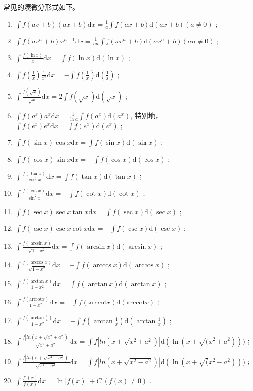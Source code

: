 常见的凑微分形式如下。

\begin{enumerate}
    \item $ \int f(ax+b)(ax+b)\mathrm{d}x = \frac{1}{a}\int f(ax+b)\mathrm{d}(ax+b) (a\neq 0) $ ;
    \item $ \int f(ax^n+b)x^{n-1}\mathrm{d}x = \frac{1}{na}\int f(ax^n+b)\mathrm{d}(ax^n + b) (an\neq0) $ ;
    \item $ \int \frac{f(\ln x)}{x}\mathrm{d}x = \int f(\ln x)\mathrm{d}(\ln x)$ ;
    \item $ \int f(\frac{1}{x})\frac{1}{x^2}\mathrm{d}x = -\int f(\frac{1}{x})\mathrm{d}(\frac{1}{x}) $ ;
    \item $ \int \frac{f(\sqrt x)}{\sqrt x} \mathrm{d}x = 2 \int f(\sqrt x)\mathrm{d}(\sqrt x) $ ;
    \item $ \int f(a^x)a^x\mathrm{d}x = \frac{1}{\ln a}\int f(a^x)\mathrm{d}(a^x) $,
    特别地，$ \int f(e^x)e^x\mathrm{d}x = \int f(e^x)\mathrm{d}(e^x) $ ;
    \item $ \int f(\sin x)\cos x \mathrm{d}x = \int f(\sin x)\mathrm{d}(\sin x) $ ;
    \item $ \int f(\cos x)\sin x \mathrm{d}x = -\int f(\cos x)\mathrm{d}(\cos x)$ ;
    \item $ \int \frac{f(\tan x)}{\cos^2 x}\mathrm{d}x = \int f(\tan x)\mathrm{d}(\tan x) $ ;
    \item $ \int \frac{f(\cot x)}{\sin^2 x}\mathrm{d}x = -\int f(\cot x)\mathrm{d}(\cot x) $ ;
    \item $ \int f(\sec x)\sec x \tan x \mathrm{d}x = \int f(\sec x)\mathrm{d}(\sec x) $ ;
    \item $ \int f(\csc x)\csc x \cot x\mathrm{d}x = -\int f(\csc x)\mathrm{d}(\csc x) $ ;
    \item $ \int \frac{f(\arcsin x)}{\sqrt{1-x^2}}\mathrm{d}x = \int f(\arcsin x)\mathrm{d}(\arcsin x) $ ;
    \item $ \int \frac{f(\arccos x)}{\sqrt{1-x^2}}\mathrm{d}x = -\int f(\arccos x)\mathrm{d}(\arccos x) $ ;
    \item $ \int \frac{f(\arctan x)}{1+x^2}\mathrm{d}x = \int f(\arctan x)\mathrm{d}(\arctan x) $ ;
    \item $ \int \frac{f(\textrm{arccot} x)}{1+x^2}\mathrm{d}x = -\int f(\textrm{arccot} x)\mathrm{d}(\textrm{arccot} x) $ ;
    \item $ \int \frac{f(\arctan \frac{1}{x})}{1+x^2}\mathrm{d}x = -\int f(\arctan \frac{1}{x})\mathrm{d}(\arctan \frac{1}{x}) $ ;
    \item $ \int \frac{f|ln(x+\sqrt{x^2+a^2})|}{\sqrt{x^2+a^2}}\mathrm{d}x = 
    \int f|ln(x+\sqrt{x^2+a^2})|\mathrm{d}(\ln(x+\sqrt(x^2+a^2))) $ ;
    \item $ \int \frac{f|ln(x+\sqrt{x^2-a^2})|}{\sqrt{x^2-a^2}}\mathrm{d}x = 
    \int f|ln(x+\sqrt{x^2-a^2})|\mathrm{d}(\ln(x+\sqrt(x^2-a^2))) $ ;
    \item $ \int \frac{f'(x)}{f(x)}\mathrm{d}x = \ln|f(x)|+C\ (f(x)\neq0) $ .
\end{enumerate}

